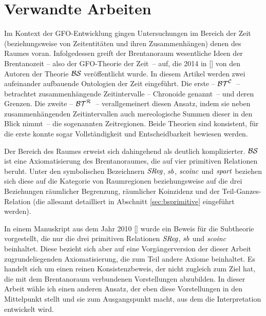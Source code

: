 \section{Verwandte Arbeiten}
Im Kontext der GFO-Entwicklung gingen Untersuchungen im Bereich der Zeit (beziehungsweise
von Zeitentitäten und ihren Zusammenhängen) denen des Raumes voran.
    Infolgedessen greift der Brentanoraum
    wesentliche Ideen der Brentanozeit -- also der GFO-Theorie der Zeit~-- auf, die 2014 in [\cite{baumann-r-2014-171-a}] von den Autoren der Theorie $\mathcal{BS}$ veröffentlicht wurde.
    In diesem Artikel werden zwei aufeinander aufbauende Ontologien der Zeit eingeführt.
    Die erste -- $\mathcal{BT}^{\mathcal{C}}$~-- betrachtet zusammenhängende Zeitintervalle -- Chronoide genannt~-- und deren Grenzen. 
    Die zweite -- $\mathcal{BT}^{\mathcal{R}}$~-- verallgemeinert diesen Ansatz, indem sie neben zusammenhängenden Zeitintervallen auch mereologische Summen dieser in den Blick nimmt~-- die sogenannten Zeitregionen.
    Beide Theorien sind konsistent, für die erste konnte sogar Vollständigkeit und Entscheidbarkeit bewiesen werden.
    
Der Bereich des Raumes erweist sich dahingehend als deutlich komplizierter.
$\mathcal{BS}$ ist eine Axiomatisierung des Brentanoraumes, die auf vier primitiven Relationen beruht. 
Unter den symbolischen Bezeichnern $\mathit{S\hspace*{-0.25ex}Reg}$, $\mathit{sb}$, $\mathit{scoinc}$ und $\mathit{spart}$ beziehen sich diese auf die Kategorie von Raumregionen beziehungsweise auf die drei Beziehungen räumlicher Begrenzung, räumlicher Koinzidenz und der Teil-Ganzes-Relation (die allesamt
detailliert in Abschnitt \ref{sec:bsprimitive} eingeführt werden).

In einem Manuskript
aus dem Jahr 2010 [\cite{baumann-r-2010-07-12-a}] wurde ein Beweis für die Subtheorie vorgestellt, die nur die drei primitiven Relationen $\mathit{S\hspace*{-0.25ex}Reg}$, $\mathit{sb}$ und $\mathit{scoinc}$ beinhaltet.
Diese bezieht sich aber auf eine Vorgängerversion der dieser Arbeit zugrundeliegenden Axiomatisierung, die zum Teil andere Axiome beinhaltet.
Es handelt sich um einen reinen Konsistenzbeweis, der nicht zugleich zum Ziel hat, die mit dem Brentanoraum verbundenen Vorstellungen abzubilden.
In dieser Arbeit wähle ich einen anderen Ansatz, der eben diese Vorstellungen in den Mittelpunkt stellt und sie zum Ausgangspunkt macht, aus dem die Interpretation entwickelt wird.

